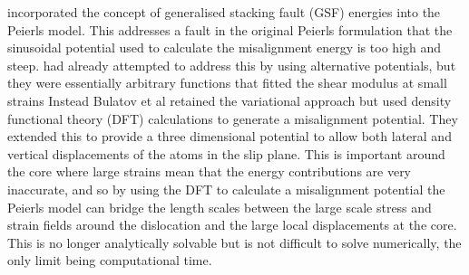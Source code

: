 \citet{Bulatov1997} incorporated the concept of generalised stacking fault (GSF) energies into the Peierls model. This addresses a fault in the original Peierls formulation that the sinusoidal potential used to calculate the misalignment energy is too high and steep. \citet{Ohsawa1994} had already attempted to address this by using alternative potentials, but they were essentially arbitrary functions that fitted the shear modulus at small strains Instead Bulatov et al retained the variational approach but used density functional theory (DFT) calculations to generate a misalignment potential. They extended this to provide a three dimensional potential to allow both lateral and vertical displacements of the atoms in the slip plane. This is important around the core where large strains mean that the energy contributions are very inaccurate, and so by using the DFT to calculate a misalignment potential the Peierls model can bridge the length scales between the large scale stress and strain fields around the dislocation and the large local displacements at the core. This is no longer analytically solvable but is not difficult to solve numerically, the only limit being computational time.










